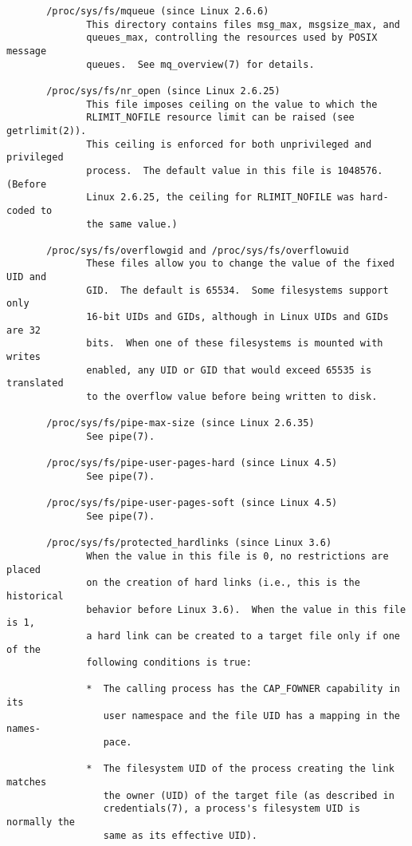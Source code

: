 \documentclass[]{article}
\begin{document}
\begin{verbatim}
       /proc/sys/fs/mqueue (since Linux 2.6.6)
              This directory contains files msg_max, msgsize_max, and
              queues_max, controlling the resources used by POSIX message
              queues.  See mq_overview(7) for details.

       /proc/sys/fs/nr_open (since Linux 2.6.25)
              This file imposes ceiling on the value to which the
              RLIMIT_NOFILE resource limit can be raised (see getrlimit(2)).
              This ceiling is enforced for both unprivileged and privileged
              process.  The default value in this file is 1048576.  (Before
              Linux 2.6.25, the ceiling for RLIMIT_NOFILE was hard-coded to
              the same value.)

       /proc/sys/fs/overflowgid and /proc/sys/fs/overflowuid
              These files allow you to change the value of the fixed UID and
              GID.  The default is 65534.  Some filesystems support only
              16-bit UIDs and GIDs, although in Linux UIDs and GIDs are 32
              bits.  When one of these filesystems is mounted with writes
              enabled, any UID or GID that would exceed 65535 is translated
              to the overflow value before being written to disk.

       /proc/sys/fs/pipe-max-size (since Linux 2.6.35)
              See pipe(7).

       /proc/sys/fs/pipe-user-pages-hard (since Linux 4.5)
              See pipe(7).

       /proc/sys/fs/pipe-user-pages-soft (since Linux 4.5)
              See pipe(7).

       /proc/sys/fs/protected_hardlinks (since Linux 3.6)
              When the value in this file is 0, no restrictions are placed
              on the creation of hard links (i.e., this is the historical
              behavior before Linux 3.6).  When the value in this file is 1,
              a hard link can be created to a target file only if one of the
              following conditions is true:

              *  The calling process has the CAP_FOWNER capability in its
                 user namespace and the file UID has a mapping in the names‐
                 pace.

              *  The filesystem UID of the process creating the link matches
                 the owner (UID) of the target file (as described in
                 credentials(7), a process's filesystem UID is normally the
                 same as its effective UID).


\end{verbatim}
\end{document}
